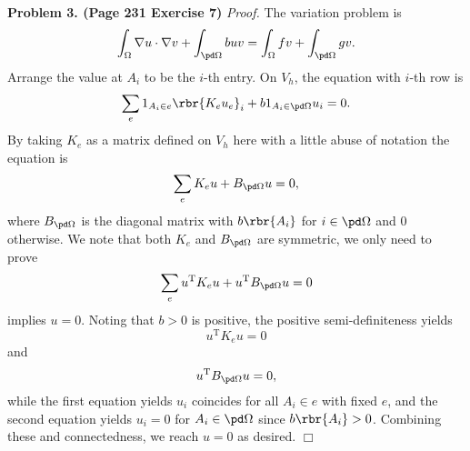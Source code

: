 \documentclass[english, nochinese]{pnote}
\begin{document}
\textbf{Problem 3. (Page 231 Exercise 7)} \textit{Proof.} The variation problem is
\begin{equation}
\int_{\Omega} \nabla u \cdot \nabla v + \int_{ \pd \Omega } b u v = \int_{\Omega} f v + \int_{ \pd \Omega } g v.
\end{equation}
Arrange the value at $A_i$ to be the $i$-th entry. On $V_h$, the equation with $i$-th row is
\begin{equation}
\sum_e 1_{ A_i \in e } \rbr{ K_e u_e }_i + b 1_{ A_i \in \pd \Omega } u_i  = 0.
\end{equation}
By taking $K_e$ as a matrix defined on $V_h$ here with a little abuse of notation the equation is
\begin{equation}
\sum_e K_e u + B_{ \pd \Omega } u = 0,
\end{equation}
where $ B_{ \pd \Omega } $ is the diagonal matrix with $ b \rbr{A_i} $ for $ i \in \pd \Omega $ and $0$ otherwise. We note that both $K_e$ and $ B_{ \pd \Omega } $ are symmetric, we only need to prove
\begin{equation}
\sum_e u^{\text{T}} K_e u + u^{\text{T}} B_{ \pd \Omega } u = 0
\end{equation}
implies $ u = 0 $. Noting that $ b > 0 $ is positive, the positive semi-definiteness yields
\begin{equation}
u^{\text{T}} K_e u = 0
\end{equation}
and
\begin{equation}
u^{\text{T}} B_{ \pd \Omega } u = 0,
\end{equation}
while the first equation yields $u_i$ coincides for all $ A_i \in e $ with fixed $e$, and the second equation yields $ u_i = 0 $ for $ A_i \in \pd \Omega $ since $ b \rbr{A_i} > 0 $. Combining these and connectedness, we reach $ u = 0 $ as desired.
\hfill$\Box$
\end{document}
